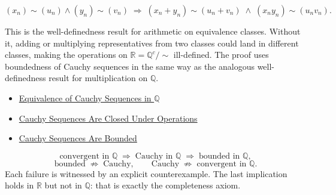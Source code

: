 \begin{remark*}
\[
(x_n) \sim (u_n) \land (y_n) \sim (v_n)
\;\Longrightarrow\;
(x_n + y_n) \sim (u_n + v_n)
\;\land\;
(x_n y_n) \sim (u_n v_n).
\]
\end{remark*}

\begin{remark*}[Interpretation]
This is the well-definedness result for arithmetic on equivalence classes.
Without it, adding or multiplying representatives from two classes could
land in different classes, making the operations on $\mathbb{R} = \mathbb{Q}^c/\!\sim$
ill-defined. The proof uses boundedness of Cauchy sequences in the same
way as the analogous well-definedness result for multiplication on $\mathbb{Q}$.
\end{remark*}

\begin{remark*}[Dependencies]
\begin{itemize}
  \item \hyperref[def:cauchy-equivalence]{Equivalence of Cauchy Sequences in $\mathbb{Q}$}
  \item \hyperref[thm:cauchy-closed-operations-q]{Cauchy Sequences Are Closed Under Operations}
  \item \hyperref[thm:cauchy-bounded-q]{Cauchy Sequences Are Bounded}
\end{itemize}
\end{remark*}

\begin{remark*}
\[
\text{convergent in } \mathbb{Q}
\;\Longrightarrow\;
\text{Cauchy in } \mathbb{Q}
\;\Longrightarrow\;
\text{bounded in } \mathbb{Q},
\]
\[
\text{bounded}
\;\not\Longrightarrow\;
\text{Cauchy},
\qquad
\text{Cauchy}
\;\not\Longrightarrow\;
\text{convergent in } \mathbb{Q}.
\]
Each failure is witnessed by an explicit counterexample. The last implication
holds in $\mathbb{R}$ but not in $\mathbb{Q}$: that is exactly the completeness
axiom.
\end{remark*}
